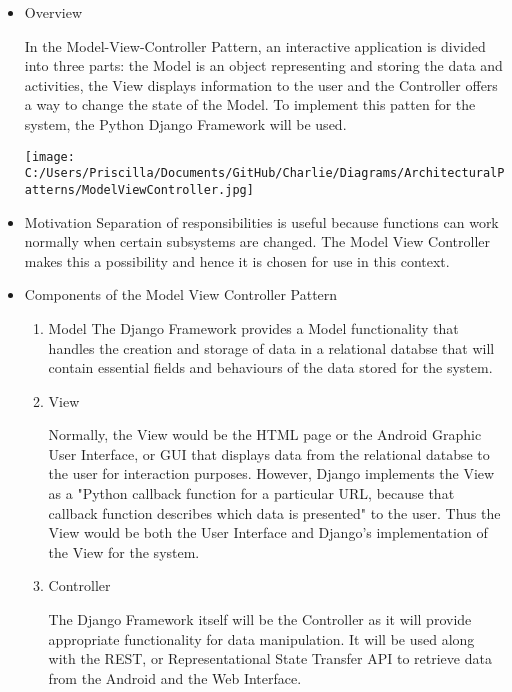 \documentclass[a4paper,12pt]{article}
\begin{document}
\begin{itemize}
\item{Overview}

In the Model-View-Controller Pattern, an interactive application is divided into three parts: the Model is an object representing and storing the data and activities, the View displays information to the user and the Controller offers a way to change the state of the Model. To implement this patten for the system, the Python Django Framework will be used.

\begin{minipage}{\linewidth} 
\centering
\texttt{[image: C:/Users/Priscilla/Documents/GitHub/Charlie/Diagrams/ArchitecturalPatterns/ModelViewController.jpg]}
\end{minipage}

\item{Motivation}
\newline
Separation of responsibilities is useful because functions can work normally when certain subsystems are changed. The Model View Controller makes this a possibility and hence it is chosen for use in this context. 

\item{Components of the Model View Controller Pattern}
\begin{enumerate}
\item{Model}
\newline
The Django Framework provides a Model functionality that handles the creation and storage of data in a relational databse that will contain essential fields and behaviours of the data stored for the system.
\newline

\item{View}

Normally, the View would be the HTML page or the Android Graphic User Interface, or GUI that displays data from the relational databse to the user for interaction purposes. However, Django implements the View as a "Python callback function for a particular  URL, because that callback function describes which data is presented" to the user. Thus the View would be both the User Interface and Django's  implementation of the View for the system.
\newline
\item{Controller}

The Django Framework itself will be the Controller as it will provide appropriate functionality for data manipulation. It will be used along with the REST, or Representational State Transfer API to retrieve data from the Android and the Web Interface.

\end{enumerate}
\end{itemize}
\end{document}
